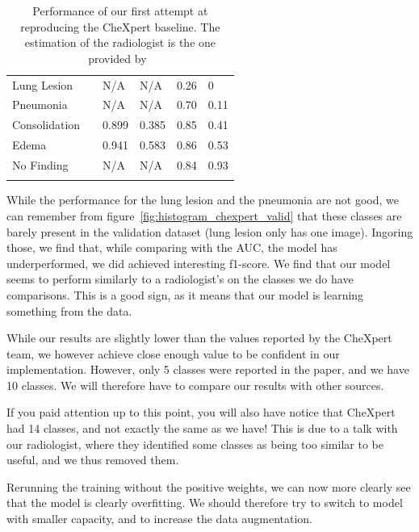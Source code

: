\documentclass[11pt]{article}
\begin{document}
\begin{table}[]
\begin{tabular}{@{}llllll@{}}
                        Lung Lesion      &  & N/A   & N/A  & 0.26 & 0    \\
                        Pneumonia        &  & N/A   & N/A  & 0.70 & 0.11 \\
                        Consolidation    &  & 0.899 & 0.385  & 0.85 & 0.41 \\
                        Edema            &  & 0.941 & 0.583  & 0.86 & 0.53 \\
                        No Finding       &  & N/A   & N/A  & 0.84 & 0.93 \\ \bottomrule
                        \label{tab:chexpert1_performance}
                        \end{tabular}
                        \caption{Performance of our first attempt at reproducing the CheXpert baseline. The estimation of the radiologist is the one provided by~\cite{chexzero}}
                \end{table}
                While the  performance for the lung lesion and the pneumonia are not good, we can remember from figure~\ref{fig:histogram_chexpert_valid} that these classes are barely present in the validation dataset (lung lesion only has one image). Ingoring those, we
                find that, while comparing with the AUC, the model has underperformed, we did achieved interesting f1-score. We find that our model seems to perform similarly to a radiologist's on the classes we do have comparisons. This is a good sign, as it means that our model is learning something from the data.

                While our results are slightly lower than the values reported by the CheXpert team, we however achieve close enough value to be confident in our implementation.
                However, only 5 classes were reported in the paper, and we have 10 classes. We will therefore have to compare our results with other sources.

                If you paid attention up to this point, you will also have notice that CheXpert had 14 classes, and not exactly the same as we have!
                This is due to a talk with our radiologist, where they identified some classes as being too similar to be useful, and we thus removed them.


                Rerunning the training without the positive weights, we can now more clearly see that the model is clearly overfitting.
                We should therefore try to switch to model with smaller capacity, and to increase the data augmentation.
\end{document}
